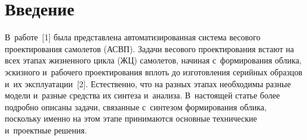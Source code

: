   



\thispagestyle{headings}

\begin{multicols}{2}

\label{st\stat}
  
\section{Введение}

  В~работе~[1] была представлена автоматизированная сис\-те\-ма весового 
проектирования самолетов (АСВП). Задачи весового проектирования встают на 
всех этапах жизненного цикла (ЖЦ) \mbox{самолетов}, начиная с~формирования облика, 
эскизного и~рабочего проектирования вплоть до изготовления серийных 
образцов и~их эксплуатации~[2]. Естественно, что на разных этапах 
необходимы разные модели и~разные средства их синтеза и~анализа. 
В~настоящей статье более подробно описаны задачи, связанные с~синтезом 
формирования облика, поскольку именно на этом этапе принимаются основные 
технические и~проектные решения.

  \begin{figure*}[b] %
  \vspace*{10pt}
      \begin{center}
     \mbox{%
\epsfxsize=160mm 
}
\end{center}
\vspace*{-8.5pt}
  \end{figure*}
  

\end{multicols}
